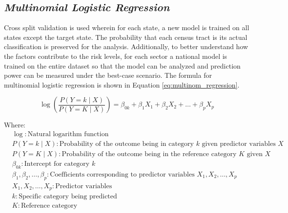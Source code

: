 \subsection{\textit{Multinomial Logistic Regression}}

Cross split validation is used wherein for each state, a new model is trained on all states except the target state. The probability that each census tract is its actual classification is preserved for the analysis. Additionally, to better understand how the \hs factors contribute to the risk levels, for each sector a national model is trained on the entire dataset so that the model can be analyzed and prediction power can be measured under the best-case scenario. The formula for multinomial logistic regression is shown in Equation \ref{eq:multinom_regression}.

\begin{equation}\label{eq:multinom_regression}
    \log\left(\frac{{P(Y = k \mid X)}}{{P(Y = K \mid X)}}\right) = \beta_{0k} + \beta_1 X_1 + \beta_2 X_2 + \dots + \beta_p X_p
\end{equation}

Where:
\begin{align*}
    & \log: \text{Natural logarithm function} \\
    & P(Y = k \mid X): \text{Probability of the outcome being in category \(k\) given predictor variables \(X\)} \\
    & P(Y = K \mid X): \text{Probability of the outcome being in the reference category \(K\) given \(X\)} \\
    & \beta_{0k}: \text{Intercept for category \(k\)} \\
    & \beta_1, \beta_2, \dots, \beta_p: \text{Coefficients corresponding to predictor variables \(X_1, X_2, \dots, X_p\)} \\
    & X_1, X_2, \dots, X_p: \text{Predictor variables} \\
    & k: \text{Specific category being predicted} \\
    & K: \text{Reference category}
\end{align*}



\endinput